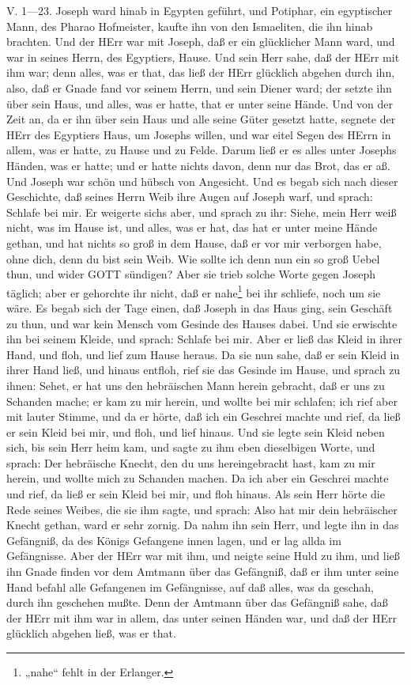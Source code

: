 \begin{schriftzitat}
V. 1—23. Joseph ward hinab in Egypten geführt, und Potiphar, ein egyptischer Mann, des Pharao Hofmeister, kaufte ihn von den Ismaeliten, die ihn hinab brachten. Und der HErr war mit Joseph, daß er ein glücklicher Mann ward, und war in seines Herrn, des Egyptiers, Hause. Und sein Herr sahe, daß der HErr mit ihm war; denn alles, was er that, das ließ der HErr glücklich abgehen durch ihn, also, daß er Gnade fand vor seinem Herrn, und sein Diener ward; der setzte ihn über sein Haus, und alles, was er hatte, that er unter seine Hände. Und von der Zeit an, da er ihn über sein Haus und alle seine Güter gesetzt hatte, segnete der HErr des Egyptiers Haus, um Josephs willen, und war eitel Segen des HErrn in allem, was er hatte, zu Hause und zu Felde. Darum ließ er es alles unter Josephs Händen, was er hatte; und er hatte nichts davon, denn nur das Brot, das er aß. Und Joseph war schön und hübsch von Angesicht. Und es begab sich nach dieser Geschichte, daß seines Herrn Weib ihre Augen auf Joseph warf, und sprach: Schlafe bei mir. Er weigerte sichs aber, und sprach zu ihr: Siehe, mein Herr weiß nicht, was im Hause ist, und alles, was er hat, das hat er unter meine Hände gethan, und hat nichts so groß in dem Hause, daß er vor mir verborgen habe, ohne dich, denn du bist sein Weib. Wie sollte ich denn nun ein so groß Uebel thun, und wider GOTT sündigen? Aber sie trieb solche Worte gegen Joseph täglich; aber er gehorchte ihr nicht, daß er nahe\footnote{„nahe“ fehlt in der Erlanger.} bei ihr schliefe, noch um sie wäre. Es
begab sich der Tage einen, daß Joseph in das Haus ging, sein Geschäft zu thun, und war kein Mensch vom Gesinde des Hauses dabei. Und sie erwischte ihn bei seinem Kleide, und sprach: Schlafe bei mir. Aber er ließ das Kleid in ihrer Hand, und floh, und lief zum Hause heraus. Da sie nun sahe, daß er sein Kleid in ihrer Hand ließ, und hinaus entfloh, rief sie das Gesinde im Hause, und sprach zu ihnen: Sehet, er hat uns den hebräischen Mann herein gebracht, daß er uns zu Schanden mache; er kam zu mir herein, und wollte bei mir schlafen; ich rief aber mit lauter Stimme, und da er hörte, daß ich ein Geschrei machte und rief, da ließ er sein Kleid bei mir, und floh, und lief hinaus. Und sie legte sein Kleid neben sich, bis sein Herr heim kam, und sagte zu ihm eben dieselbigen Worte, und sprach: Der hebräische Knecht, den du uns hereingebracht hast, kam zu mir herein, und wollte mich zu Schanden machen. Da ich aber ein Geschrei machte und rief, da ließ er sein Kleid bei mir, und floh hinaus. Als sein Herr hörte die Rede seines Weibes, die sie ihm sagte, und sprach: Also hat mir dein hebräischer Knecht gethan, ward er sehr zornig. Da nahm ihn sein Herr, und legte ihn in das Gefängniß, da des Königs Gefangene innen lagen, und er lag allda im Gefängnisse. Aber der HErr war mit ihm, und neigte seine Huld zu ihm, und ließ ihn Gnade finden vor dem Amtmann über das Gefängniß, daß er ihm unter seine Hand befahl alle Gefangenen im Gefängnisse, auf daß alles, was da geschah, durch ihn geschehen mußte. Denn der Amtmann über das Gefängniß sahe, daß der HErr mit ihm war in allem, das unter seinen Händen war, und daß der HErr glücklich abgehen ließ, was er that.
\end{schriftzitat}

